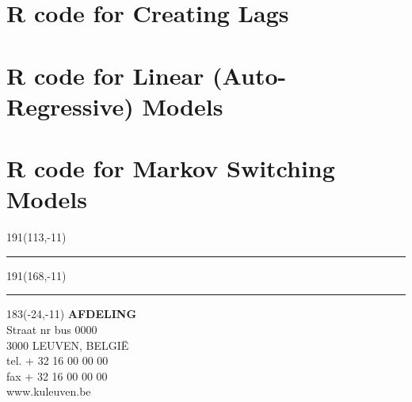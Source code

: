 \documentclass[12pt,a4paper,oneside]{book}
\begin{document}
\section*{R code for Creating Lags}


\section*{R code for Linear (Auto-Regressive) Models}


\section*{R code for Markov Switching Models}

\newpage

\thispagestyle{empty}
\sffamily
%
\begin{textblock}{191}(113,-11)
{\color{blueline}\rule{160pt}{5.5pt}}
\end{textblock}
%
\begin{textblock}{191}(168,-11)
{\color{blueline}\rule{5.5pt}{59pt}}
\end{textblock}
%
\begin{textblock}{183}(-24,-11)
\textblockcolour{}
\flushright
\fontsize{7}{7.5}\selectfont
\textbf{AFDELING}\\
Straat nr bus 0000\\
3000 LEUVEN, BELGI\"{E}\\
tel. + 32 16 00 00 00\\
fax + 32 16 00 00 00\\
www.kuleuven.be\\
\end{textblock}
%
\end{document}
